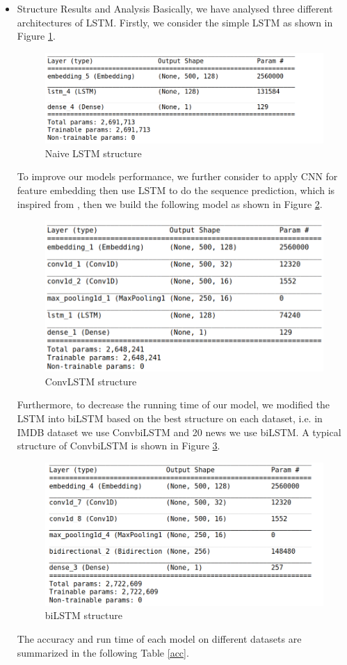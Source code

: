 \documentclass[11pt]{scrartcl}
\begin{document}
\begin{itemize}
	\item Structure Results and Analysis
	Basically, we have analysed three different architectures of LSTM. Firstly, we consider the simple LSTM as shown in Figure \ref{LSTM}.
	\begin{figure}[H]
	\centering
	\includegraphics[width=0.9 \linewidth]{fig/lstm.png}
	\caption{Naive LSTM structure}
	\label{LSTM}
\end{figure}
	To improve our models performance, we further consider to apply CNN for feature embedding then use LSTM to do the sequence prediction, which is inspired from \cite{LSTM+CNN}, then we build the following model as shown in Figure \ref{ConvLSTM}.
	\begin{figure}[H]
	\centering
	\includegraphics[width=0.6\linewidth]{fig/convlstm.png}
	\caption{ConvLSTM structure}
	\label{ConvLSTM}
\end{figure}
	Furthermore, to decrease the running time of our model, we modified the LSTM into biLSTM based on the best structure on each dataset, i.e. in IMDB dataset we use ConvbiLSTM and 20 news we use biLSTM. A typical structure of ConvbiLSTM is shown in Figure \ref{bilstm}.
	\begin{figure}[H]
	\centering
	\includegraphics[width=0.7\linewidth]{fig/bilstm.png}
	\caption{biLSTM structure}
	\label{bilstm}
\end{figure}
The accuracy and run time of each model on different datasets are summarized in the following Table \ref{acc}.


\end{itemize}
\end{document}
